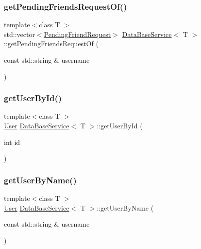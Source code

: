 \subsubsection{\texorpdfstring{get\+Pending\+Friends\+Request\+Of()}{getPendingFriendsRequestOf()}\hspace{0.1cm}{\footnotesize\ttfamily [2/2]}}
{\footnotesize\ttfamily template$<$class T $>$ \\
std\+::vector$<$\mbox{\hyperlink{structPendingFriendRequest}{Pending\+Friend\+Request}}$>$ \mbox{\hyperlink{classDataBaseService}{Data\+Base\+Service}}$<$ T $>$\+::get\+Pending\+Friends\+Request\+Of (\begin{DoxyParamCaption}\item[{const std\+::string \&}]{username }\end{DoxyParamCaption})\hspace{0.3cm}{\ttfamily [inline]}}

\mbox{\label{classDataBaseService_a04a13e93541e53fa750bf169ec0b5b85}} 
\subsubsection{\texorpdfstring{get\+User\+By\+Id()}{getUserById()}}
{\footnotesize\ttfamily template$<$class T $>$ \\
\mbox{\hyperlink{structUser}{User}} \mbox{\hyperlink{classDataBaseService}{Data\+Base\+Service}}$<$ T $>$\+::get\+User\+By\+Id (\begin{DoxyParamCaption}\item[{int}]{id }\end{DoxyParamCaption})\hspace{0.3cm}{\ttfamily [inline]}}

\mbox{\label{classDataBaseService_a1e0272ebe8dd31859b810e6f797cde5b}} 
\subsubsection{\texorpdfstring{get\+User\+By\+Name()}{getUserByName()}}
{\footnotesize\ttfamily template$<$class T $>$ \\
\mbox{\hyperlink{structUser}{User}} \mbox{\hyperlink{classDataBaseService}{Data\+Base\+Service}}$<$ T $>$\+::get\+User\+By\+Name (\begin{DoxyParamCaption}\item[{const std\+::string \&}]{username }\end{DoxyParamCaption})\hspace{0.3cm}{\ttfamily [inline]}}

